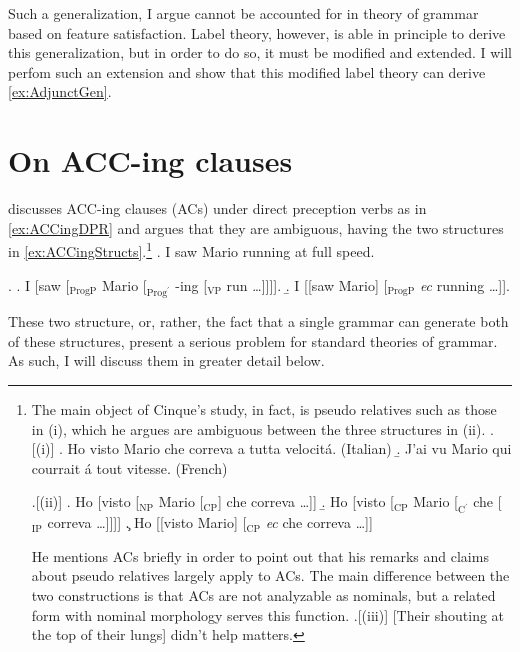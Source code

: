 \documentclass[MilwayThesis]{subfiles}
\begin{document}
Such a generalization, I argue cannot be accounted for in theory of grammar based on feature satisfaction.
Label theory, however, is able in principle to derive this generalization, but in order to do so, it must be modified and extended.
I will perfom such an extension and show that this modified label theory can derive \cref{ex:AdjunctGen}.

\section{On ACC-ing clauses}

\textcite{cinque1996pseudo} discusses ACC-ing clauses (ACs) under direct preception verbs as in \cref{ex:ACCingDPR} and argues that they are ambiguous, having the two structures in \cref{ex:ACCingStructs}.\footnote{
	The main object of Cinque's study, in fact, is pseudo relatives such as those in (i), which he argues are ambiguous between the three structures in (ii).
	\ex.[(i)]\label{ex:PR}
	\a. Ho visto Mario che correva a tutta velocit\'a. (Italian)
	\b. J'ai vu Mario qui courrait \'a tout vitesse. (French)

	\ex.[(ii)]\label{ex:PRStruct}
	\a. Ho [visto [$_\text{NP}$ Mario [$_\text{CP}$] che correva \ldots ]]
	\b. Ho [visto [$_\text{CP}$ Mario [$_{\text{C}^\prime}$ che [$_\text{IP}$ correva \ldots ]]]]
	\c. Ho [[visto Mario] [$_\text{CP}$ \textit{ec} che correva \ldots]]

	He mentions ACs briefly in order to point out that his remarks and claims about pseudo relatives largely apply to ACs.
	The main difference between the two constructions is that ACs are not analyzable as nominals, but a related form with nominal morphology serves this function.
	\ex.[(iii)] [Their shouting at the top of their lungs] didn't help matters.

}
\ex. I saw Mario running at full speed. \label{ex:ACCingDPR} 

\ex.\label{ex:ACCingStructs}
\a. I [saw [$_\text{ProgP}$ Mario [$_{\text{Prog}^\prime}$ -ing [$_\text{VP}$ run \ldots]]]].
\b. I [[saw Mario] [$_\text{ProgP}$ \textit{ec} running \ldots]].

These two structure, or, rather, the fact that a single grammar can generate both of these structures, present a serious problem for standard theories of grammar.
As such, I will discuss them in greater detail below.
\end{document}
